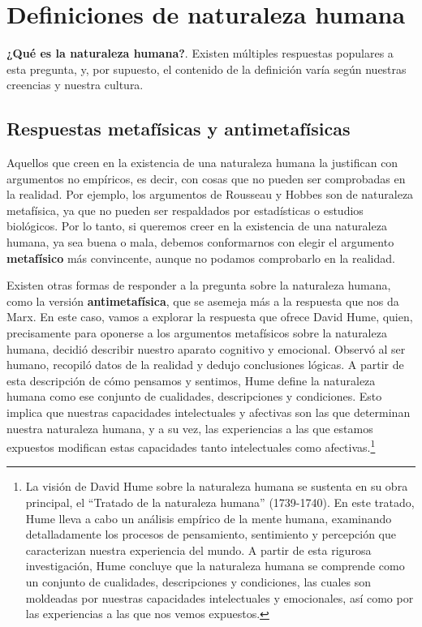 \documentclass[
  a4paper,
]{article}
\begin{document}
\section{Definiciones de naturaleza
humana}\label{definiciones-de-naturaleza-humana}

\textbf{¿Qué es la naturaleza humana?}. Existen múltiples respuestas
populares a esta pregunta, y, por supuesto, el contenido de la
definición varía según nuestras creencias y nuestra cultura.

\subsection{Respuestas metafísicas y
antimetafísicas}\label{respuestas-metafuxedsicas-y-antimetafuxedsicas}

Aquellos que creen en la existencia de una naturaleza humana la
justifican con argumentos no empíricos, es decir, con cosas que no
pueden ser comprobadas en la realidad. Por ejemplo, los argumentos de
Rousseau y Hobbes son de naturaleza metafísica, ya que no pueden ser
respaldados por estadísticas o estudios biológicos. Por lo tanto, si
queremos creer en la existencia de una naturaleza humana, ya sea buena o
mala, debemos conformarnos con elegir el argumento \textbf{metafísico}
más convincente, aunque no podamos comprobarlo en la realidad.

Existen otras formas de responder a la pregunta sobre la naturaleza
humana, como la versión \textbf{antimetafísica}, que se asemeja más a la
respuesta que nos da Marx. En este caso, vamos a explorar la respuesta
que ofrece David Hume, quien, precisamente para oponerse a los
argumentos metafísicos sobre la naturaleza humana, decidió describir
nuestro aparato cognitivo y emocional. Observó al ser humano, recopiló
datos de la realidad y dedujo conclusiones lógicas. A partir de esta
descripción de cómo pensamos y sentimos, Hume define la naturaleza
humana como ese conjunto de cualidades, descripciones y condiciones.
Esto implica que nuestras capacidades intelectuales y afectivas son las
que determinan nuestra naturaleza humana, y a su vez, las experiencias a
las que estamos expuestos modifican estas capacidades tanto
intelectuales como afectivas.\footnote{La visión de David Hume sobre la
  naturaleza humana se sustenta en su obra principal, el ``Tratado de la
  naturaleza humana'' (1739-1740). En este tratado, Hume lleva a cabo un
  análisis empírico de la mente humana, examinando detalladamente los
  procesos de pensamiento, sentimiento y percepción que caracterizan
  nuestra experiencia del mundo. A partir de esta rigurosa
  investigación, Hume concluye que la naturaleza humana se comprende
  como un conjunto de cualidades, descripciones y condiciones, las
  cuales son moldeadas por nuestras capacidades intelectuales y
  emocionales, así como por las experiencias a las que nos vemos
  expuestos.}
\end{document}
